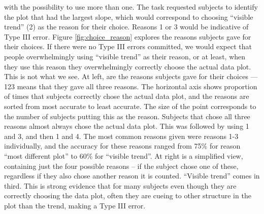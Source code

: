 \documentclass[12pt]{article}
\newcommand{\blue}[1]{{\color{blue} #1}} %
\newcommand{\green}[1]{{\color{green} #1}} %
\begin{document}
\noindent with the possibility to use more than one. The task requested subjects to identify the plot that had the largest slope, which would correspond to choosing ``visible trend'' (2) as the reason for their choice. Reasons 1 or 3 would be indicative of Type III error. Figure \ref{fig:choice_reason} explores the reasons subjects gave for their choices. If there were no Type III errors committed, we would expect that people overwhelmingly using ``visible trend'' as their reason, or at least, when they use this reason they overwhelmingly correctly choose the actual data plot. This is not what we see. At left, are the reasons subjects gave for their choices --- 123 means that they gave all three reasons. The horizontal axis shows proportion of times that subjects correctly chose the actual data plot, and the reasons are sorted from most accurate to least accurate. The size of the point corresponds to the number of subjects putting this as the reason. Subjects that chose all three reasons almost always chose the actual data plot. This was followed by using 1 and 3, and then 1 and 4. The most common reasons given were reasons 1-3 individually, and the accuracy for these reasons ranged from 75\% for reason ``most different plot'' to 60\% for ``visible trend''.
At right is a simplified view, containing just the four possible reasons -- if the subject chose one of these, regardless if they also chose another reason it is counted. ``Visible trend'' comes in third. This is strong evidence that for many subjects even though they are correctly choosing the data plot, often they are cueing to other structure in the plot than the trend, making a Type III error. 




\end{document}
